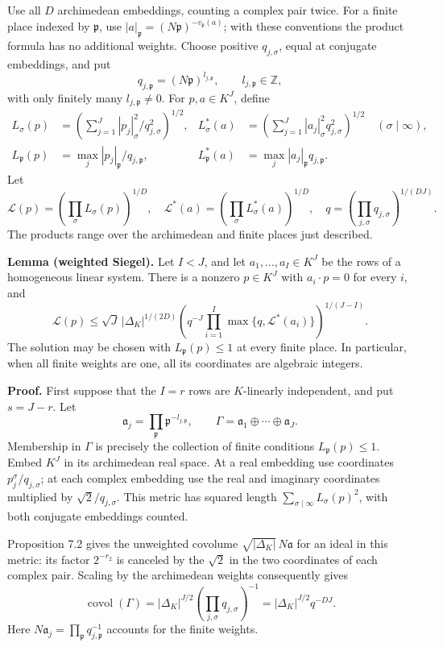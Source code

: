 \documentclass[
  11pt,
  a4paper,
]{article}
\begin{document}
Use all \(D\) archimedean embeddings, counting a complex pair twice. For
a finite place indexed by \(\mathfrak p\), use
\(|a|_{\mathfrak p}=(N\mathfrak p)^{-v_{\mathfrak p}(a)}\); with these
conventions the product formula has no additional weights. Choose
positive \(q_{j,\sigma}\), equal at conjugate embeddings, and put \[
q_{j,\mathfrak p}=(N\mathfrak p)^{l_{j,\mathfrak p}},
\qquad l_{j,\mathfrak p}\in\mathbb Z,
\] with only finitely many \(l_{j,\mathfrak p}\ne0\). For
\(p,a\in K^J\), define \[
\begin{aligned}
L_\sigma(p)&=
\left(\sum_{j=1}^J|p_j|_\sigma^2/q_{j,\sigma}^2\right)^{1/2},
&
L_\sigma^*(a)&=
\left(\sum_{j=1}^J|a_j|_\sigma^2q_{j,\sigma}^2\right)^{1/2}
\quad(\sigma\mid\infty),\\
L_{\mathfrak p}(p)&=\max_j |p_j|_{\mathfrak p}/q_{j,\mathfrak p},
&
L_{\mathfrak p}^*(a)&=\max_j |a_j|_{\mathfrak p}q_{j,\mathfrak p}.
\end{aligned}
\] Let \[
\mathcal L(p)=\left(\prod_\sigma L_\sigma(p)\right)^{1/D},
\quad
\mathcal L^*(a)=\left(\prod_\sigma L_\sigma^*(a)\right)^{1/D},
\quad
q=\left(\prod_{j,\sigma}q_{j,\sigma}\right)^{1/(DJ)}.
\] The products range over the archimedean and finite places just
described.

\textbf{Lemma (weighted Siegel).} Let \(I<J\), and let
\(a_1,\ldots,a_I\in K^J\) be the rows of a homogeneous linear system.
There is a nonzero \(p\in K^J\) with \(a_i\cdot p=0\) for every \(i\),
and \[
\mathcal L(p)\le
\sqrt J\,|\Delta_K|^{1/(2D)}
\left(q^{-J}\prod_{i=1}^I
\max\{q,\mathcal L^*(a_i)\}\right)^{1/(J-I)}.
\tag{8.40}
\] The solution may be chosen with \(L_{\mathfrak p}(p)\le1\) at every
finite place. In particular, when all finite weights are one, all its
coordinates are algebraic integers.

\textbf{Proof.} First suppose that the \(I=r\) rows are \(K\)-linearly
independent, and put \(s=J-r\). Let \[
\mathfrak a_j=\prod_{\mathfrak p}\mathfrak p^{-l_{j,\mathfrak p}},
\qquad
\Gamma=\mathfrak a_1\oplus\cdots\oplus\mathfrak a_J.
\] Membership in \(\Gamma\) is precisely the collection of finite
conditions \(L_{\mathfrak p}(p)\le1\). Embed \(K^J\) in its archimedean
real space. At a real embedding use coordinates
\(p_j^\sigma/q_{j,\sigma}\); at each complex embedding use the real and
imaginary coordinates multiplied by \(\sqrt2/q_{j,\sigma}\). This metric
has squared length \(\sum_{\sigma\mid\infty} L_\sigma(p)^2\), with both
conjugate embeddings counted.

Proposition 7.2 gives the unweighted covolume
\(\sqrt{|\Delta_K|}\,N\mathfrak a\) for an ideal in this metric: its
factor \(2^{-r_2}\) is canceled by the \(\sqrt2\) in the two coordinates
of each complex pair. Scaling by the archimedean weights consequently
gives \[
\operatorname{covol}(\Gamma)
=|\Delta_K|^{J/2}
\left(\prod_{j,\sigma}q_{j,\sigma}\right)^{-1}
=|\Delta_K|^{J/2}q^{-DJ}.
\tag{8.41}
\] Here \(N\mathfrak a_j=\prod_{\mathfrak p}q_{j,\mathfrak p}^{-1}\)
accounts for the finite weights.
\end{document}
